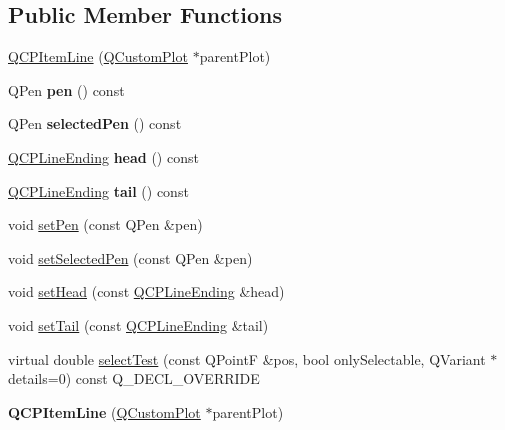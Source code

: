 \subsection*{Public Member Functions}
\begin{DoxyCompactItemize}
\item 
\hyperlink{class_q_c_p_item_line_a17804b7f64961c6accf25b61e85142e3}{Q\+C\+P\+Item\+Line} (\hyperlink{class_q_custom_plot}{Q\+Custom\+Plot} $\ast$parent\+Plot)
\item 
Q\+Pen {\bfseries pen} () const \hypertarget{class_q_c_p_item_line_a235779dd079a263bedb20b3daecc40eb}{}\label{class_q_c_p_item_line_a235779dd079a263bedb20b3daecc40eb}

\item 
Q\+Pen {\bfseries selected\+Pen} () const \hypertarget{class_q_c_p_item_line_a9fde5e95a1a369008252e18f1925650c}{}\label{class_q_c_p_item_line_a9fde5e95a1a369008252e18f1925650c}

\item 
\hyperlink{class_q_c_p_line_ending}{Q\+C\+P\+Line\+Ending} {\bfseries head} () const \hypertarget{class_q_c_p_item_line_a5f6cbc5c763feae9dfbce71748fc43f1}{}\label{class_q_c_p_item_line_a5f6cbc5c763feae9dfbce71748fc43f1}

\item 
\hyperlink{class_q_c_p_line_ending}{Q\+C\+P\+Line\+Ending} {\bfseries tail} () const \hypertarget{class_q_c_p_item_line_a5d2ca0f784933e80f3e6e1d15dceebb3}{}\label{class_q_c_p_item_line_a5d2ca0f784933e80f3e6e1d15dceebb3}

\item 
void \hyperlink{class_q_c_p_item_line_a572528dab61c1abe205822fbd5db4b27}{set\+Pen} (const Q\+Pen \&pen)
\item 
void \hyperlink{class_q_c_p_item_line_a3e2fec44503277e77717e9c24f87f1ea}{set\+Selected\+Pen} (const Q\+Pen \&pen)
\item 
void \hyperlink{class_q_c_p_item_line_aebf3d687114d584e0459db6759e2c3c3}{set\+Head} (const \hyperlink{class_q_c_p_line_ending}{Q\+C\+P\+Line\+Ending} \&head)
\item 
void \hyperlink{class_q_c_p_item_line_ac264222c3297a7efe33df9345c811a5f}{set\+Tail} (const \hyperlink{class_q_c_p_line_ending}{Q\+C\+P\+Line\+Ending} \&tail)
\item 
virtual double \hyperlink{class_q_c_p_item_line_a8e02bfbca04fbcf3dbc375a2bf693229}{select\+Test} (const Q\+PointF \&pos, bool only\+Selectable, Q\+Variant $\ast$details=0) const Q\+\_\+\+D\+E\+C\+L\+\_\+\+O\+V\+E\+R\+R\+I\+DE
\item 
{\bfseries Q\+C\+P\+Item\+Line} (\hyperlink{class_q_custom_plot}{Q\+Custom\+Plot} $\ast$parent\+Plot)\hypertarget{class_q_c_p_item_line_a17804b7f64961c6accf25b61e85142e3}{}\label{class_q_c_p_item_line_a17804b7f64961c6accf25b61e85142e3}


\end{DoxyCompactItemize}
